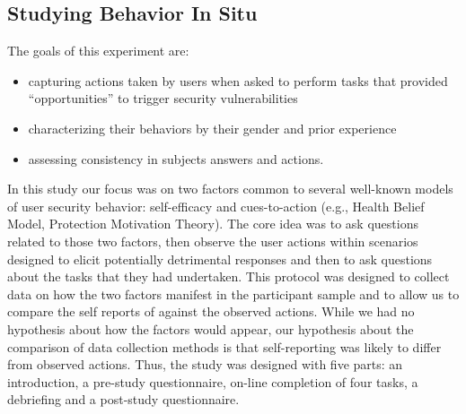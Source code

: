 \subsection{Studying Behavior In Situ}
The goals of this experiment are:
\begin{itemize}
 \item capturing actions taken by users when asked to perform tasks that provided ``opportunities'' to trigger security vulnerabilities
 \item characterizing their behaviors by their gender and prior experience
 \item assessing consistency in subjects answers
and actions.
 \end{itemize}
In this study our focus was on two factors common to several well-known models of user security behavior: self-efficacy and cues-to-action (e.g., Health Belief Model, Protection Motivation Theory). The core idea was to ask questions related to those two factors, then observe the user actions within scenarios designed to elicit potentially detrimental responses and then to ask questions about the tasks that they had undertaken. This protocol was designed to collect data on how the two factors manifest in the participant sample and to allow us to compare the self reports of against the observed actions. While we had no hypothesis about how the factors would appear, our hypothesis about the comparison of data collection methods is that self-reporting was likely to differ from observed actions. Thus, the study was designed with five parts: an introduction, a pre-study questionnaire, on-line completion of four tasks, a debriefing and a post-study questionnaire.

